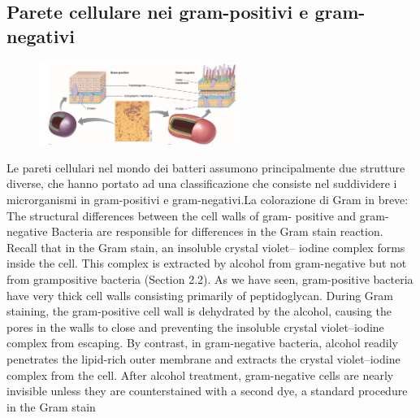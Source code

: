 \subsection{Parete cellulare nei gram-positivi e gram-negativi}
\begin{figure}
  \begin{center}
    \includegraphics[width=0.58\textwidth]{Pictures/3.png}
  \end{center}
\end{figure}
Le pareti cellulari nel mondo dei batteri assumono principalmente due strutture diverse, che hanno portato ad una classificazione che consiste nel 
suddividere i microrganismi in gram-positivi e gram-negativi.La colorazione di Gram in breve: The structural differences between the cell walls of gram-
positive and gram-negative Bacteria are responsible for differences in the Gram stain reaction. Recall that in the Gram stain, an insoluble crystal violet–
iodine complex forms inside the cell. This complex is extracted by alcohol from gram-negative but not from grampositive bacteria (Section 2.2). As we have 
seen, gram-positive bacteria have very thick cell walls consisting primarily of peptidoglycan. During Gram staining, the gram-positive cell wall is 
dehydrated by the alcohol, causing the pores in the walls to close and preventing the insoluble crystal violet–iodine complex from escaping. By contrast, in 
gram-negative bacteria, alcohol readily penetrates the lipid-rich outer membrane and extracts the crystal violet–iodine complex from the cell. After alcohol 
treatment, gram-negative cells are nearly invisible unless they are counterstained with a second dye, a standard procedure in the Gram stain
